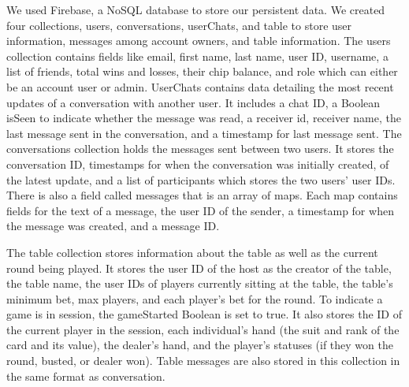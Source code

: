 We used Firebase, a NoSQL database to store our persistent data. We created four collections, users, conversations, userChats, and table to store user information, messages among account owners, and table information. The users collection contains fields like email, first name, last name, user ID, username, a list of friends, total wins and losses, their chip balance, and role which can either be an account user or admin. UserChats contains data detailing the most recent updates of a conversation with another user. It includes a chat ID, a Boolean isSeen to indicate whether the message was read, a receiver id, receiver name, the last message sent in the conversation, and a timestamp for last message sent. The conversations collection holds the messages sent between two users. It stores the conversation ID, timestamps for when the conversation was initially created, of the latest update, and a list of participants which stores the two users’ user IDs. There is also a field called messages that is an array of maps. Each map contains fields for the text of a message, the user ID of the sender, a timestamp for when the message was created, and a message ID.

 The table collection stores information about the table as well as the current round being played. It stores the user ID of the host as the creator of the table, the table name, the user IDs of players currently sitting at the table, the table’s minimum bet, max players, and each player’s bet for the round. To indicate a game is in session, the gameStarted Boolean is set to true. It also stores the ID of the current player in the session, each individual’s hand (the suit and rank of the card and its value), the dealer’s hand, and the player’s statuses (if they won the round, busted, or dealer won). Table messages are also stored in this collection in the same format as conversation.

 \clearpage
